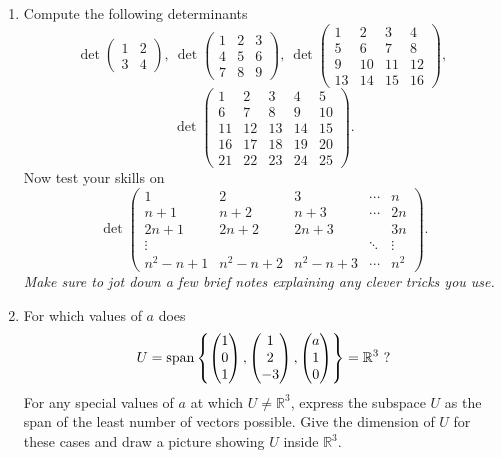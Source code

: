 \begin{enumerate}
\item
Compute the following determinants
$$
\det\begin{pmatrix}1&2\\3&4
\end{pmatrix},\:
\det\begin{pmatrix}1&2&3\\4&5&6\\7&8&9
\end{pmatrix},\:
\det\begin{pmatrix}1&2&3&4\\5&6&7&8\\9&10&11&12\\13&14&15&16
\end{pmatrix} ,\:$$ $$
\det\begin{pmatrix}1&2&3&4&5\\6&7&8&9&10\\11&12&13&14&15\\
16&17&18&19&20\\21&22&23&24&25
\end{pmatrix}.
$$
Now test your skills on
$$
\det\left(\begin{array}{ccccc}1&2&3&\cdots&n\\n+1&n+2&n+3&\cdots&2n\\2n+1&2n+2&2n+3&&3n \\
\vdots&&&\ddots&\vdots\\n^2-n+1&n^2-n+2&n^2-n+3&\cdots&n^2
\end{array}\right).
$$
{\it Make sure to jot down a few brief notes explaining any clever tricks you use.}

\item
For which values of $a$ does $$U={\rm span} \left\{
\begin{pmatrix}1\\0\\1\end{pmatrix},\begin{pmatrix}1\\2\\-3\end{pmatrix},\begin{pmatrix}a\\1\\0\end{pmatrix}\right\}={\mathbb R}^3\ ?$$
 For any special values of $a$ at which $U\neq{\mathbb R}^3$, express the subspace $U$ as the span of the least number of vectors possible. Give the dimension of $U$ for these cases and
 draw a picture showing $U$ inside ${\mathbb R}^3$.


\end{enumerate}
